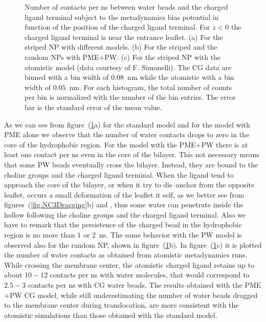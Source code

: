 \begin{figure}[ht!]
{	}%
	\caption{Number of contacts per ns between water beads and the charged ligand terminal subject to the metadynamics bias potential in function of the position of the charged ligand terminal. For $z<0$ the charged ligand terminal is near the entrance leaflet. (a) For the striped \acs{NP} with different models. (b) For the striped and the random \acs{NP}s with \acs{PME}+\acs{PW}. (c) For the striped \acs{NP} with the atomistic model (data courtesy of F. Simonelli). The \ac{CG} data are binned with a bin width of $0.08$~nm while the atomistic with a bin width of $0.05$~nm. For each histogram, the total number of counts per bin is normalized with the number of the bin entries. The error bar is the standard error of the mean value.}%
	\label{fig:WContact}
\end{figure}

As we can see from figure~(\ref{fig:WContact}a) for the standard \martini model and for the model with \ac{PME} alone we observe that the number of water contacts drops to zero in the core of the hydrophobic region. For the model with the \ac{PME}+\ac{PW} there is at least one contact per ns even in the core of the bilayer. This not necessary means that some \ac{PW} beads eventually cross the bilayer. Instead, they are bound to the choline groups and the charged ligand terminal. When the ligand tend to approach the core of the bilayer, or when it try to dis--anchor from the opposite leaflet, occurs a small deformation of the leaflet it self, as we better see from figures~(\ref{fig:NC3Dragging}b) and , thus some water can penetrate inside the hollow following the choline groups and the charged ligand terminal. Also we have to remark that the persistence of the charged bead in the hydrophobic region is no more than $1$ or $2$~ns. The same behavior with the \ac{PW} model is observed also for the random \ac{NP}, shown in figure~(\ref{fig:WContact}b). In figure~(\ref{fig:WContact}c) it is plotted the number of water contacts as obtained from atomistic metadynamics runs. While crossing the membrane center, the atomistic charged ligand retains up to about $10-12$ contacts per ns with water molecules, that would correspond to $2.5-3$ contacts per ns with \martini \ac{CG} water beads. The results obtained with the \ac{PME}$+$\ac{PW} \ac{CG} model, while still underestimating the number of water beads dragged to the membrane center during translocation, are more consistent with the atomistic simulations than those obtained with the standard \martini model.

